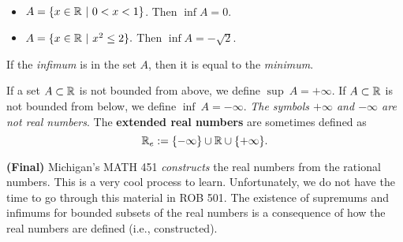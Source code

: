 \begin{example} \mbox{ }
\begin{itemize}
\item $A = \{  x\in \mathbb R~|~ 0  < x < 1\}$. Then $\inf A =0$.
\item $A= \{ x\in \mathbb R~|~ x^2 \le 2\}.$ Then  $\inf A =-\sqrt{2}$.
\end{itemize}
\end{example}


\begin{rem}
 If the \emph{infimum} is in the set $A$, then it is equal to the \emph{minimum}.
\end{rem}

\begin{definition}
If a set $A\subset \mathbb R$ is not bounded from above, we define $\sup~A = +\infty$. If $A\subset \mathbb R$ is not bounded from below, we define $\inf~A = -\infty$. \emph{The symbols  $+\infty$ and $-\infty$ are not real numbers}. The \textbf{extended real numbers} are sometimes defined as
$$\mathbb R_e:=\{-\infty\} \cup \mathbb R \cup \{+\infty \}.$$
\end{definition} 


\begin{rem}
 \textbf{(Final)} Michigan's MATH 451 \emph{constructs} the real numbers from the rational numbers. This is a very cool process to learn. Unfortunately, we do not have the time to go through this material in ROB 501. The existence of supremums and infimums for bounded subsets of the real numbers is a consequence of how the real numbers are defined (i.e., constructed).
\end{rem}


